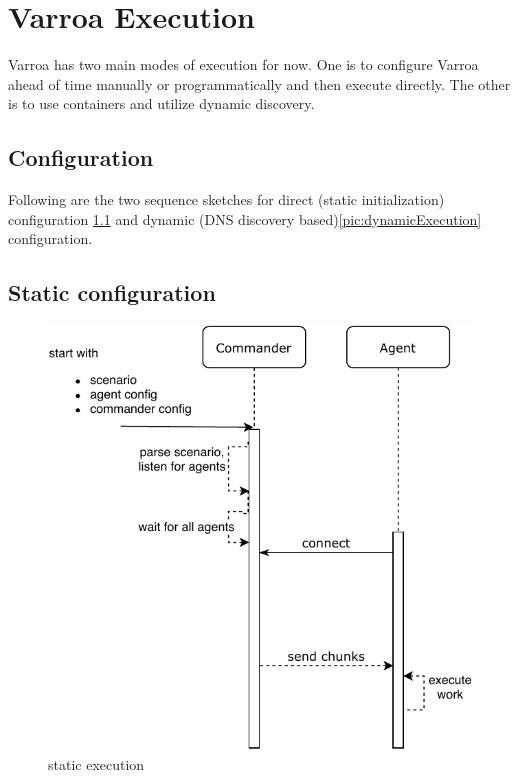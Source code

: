 \chapter{Varroa Execution}

Varroa has two main modes of execution for now. One is to configure Varroa ahead of time manually or programmatically and then execute directly. The other is to use containers and utilize dynamic discovery.

\section{Configuration}
Following are the two sequence sketches for direct (static initialization) configuration \ref{pic:staticExecution} and dynamic (DNS discovery based)\ref{pic:dynamicExecution} configuration.

\section{Static configuration}
\begin{figure}[h]
\begin{center}
\includegraphics[scale=0.65]{Resources/PDF/ExecutionStaticInit}
\caption{static execution}
\label{pic:staticExecution}
\end{center}
\end{figure}

